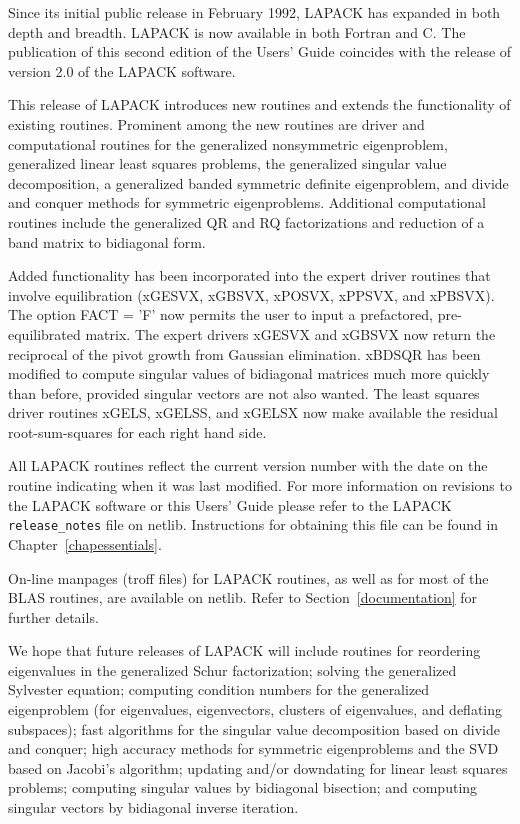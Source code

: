 Since its initial public release in February 1992, LAPACK has expanded
in both depth and breadth.  LAPACK is now available in both Fortran and C.
The publication of this second edition of the
Users' Guide coincides with the release of version 2.0
of the LAPACK software.

This release of LAPACK introduces
new routines and extends the functionality of 
existing routines.  Prominent among the new routines are 
driver and computational routines for 
the generalized nonsymmetric eigenproblem, 
generalized linear least squares problems, 
the generalized singular value decomposition, 
a generalized banded symmetric definite eigenproblem,
and divide and conquer methods for symmetric eigenproblems.  
Additional computational routines include 
the generalized QR and RQ factorizations and
reduction of a band matrix to bidiagonal form.

Added functionality has been incorporated into the expert driver
routines that involve equilibration (xGESVX, xGBSVX, xPOSVX, xPPSVX,
and xPBSVX).  The option FACT = 'F' now permits the user to input a
prefactored, pre-equilibrated matrix.  The expert drivers xGESVX and xGBSVX
now return the reciprocal of the pivot growth from Gaussian
elimination.  xBDSQR has been modified to compute singular values of
bidiagonal matrices much more quickly than before, provided singular
vectors are not also wanted.
The least squares driver
routines xGELS, xGELSS, and xGELSX now make available the residual 
root-sum-squares for each right hand side.  

All LAPACK routines reflect the current version number with the
date on the routine indicating when it was last modified.
For more information on revisions to the LAPACK software or this Users'
Guide please refer to the LAPACK {\tt release\_notes} file on netlib.
Instructions for obtaining this file can be found in
Chapter~\ref{chapessentials}.

On-line manpages (troff files) for LAPACK routines, as well as for most of 
the BLAS routines, are available on netlib.  Refer to
Section~\ref{documentation} for further details.

We hope that future releases of LAPACK will include routines for reordering
eigenvalues in the generalized Schur factorization; 
solving the generalized Sylvester
equation; computing condition numbers for the generalized eigenproblem
(for eigenvalues, eigenvectors, clusters of eigenvalues, and deflating
subspaces);
fast algorithms for the singular value decomposition based on 
divide and conquer;
high accuracy methods for symmetric eigenproblems and the SVD based
on Jacobi's algorithm;
updating and/or downdating for linear least squares problems; 
computing singular values by bidiagonal
bisection; and computing singular vectors by bidiagonal inverse iteration.


